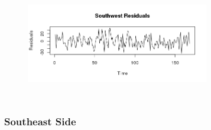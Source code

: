 \documentclass{article} %
\begin{document}
\begin{center}
\begin{figure}[H]
\includegraphics[height=50mm, width=80mm]{Plots/southwest_resid.png}
\end{figure}
\end{center}
 
 
\subsubsection{Southeast Side}
 
\end{document}
